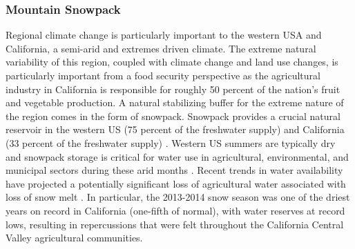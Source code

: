 \documentclass[11pt]{article}
\begin{document}
\subsubsection{Mountain Snowpack}

Regional climate change is particularly important to the western USA and California, a semi-arid and extremes driven climate.  The extreme natural variability of this region, coupled with climate change and land use changes, is particularly important from a food security perspective as the agricultural industry in California is responsible for roughly 50 percent of the nation's fruit and vegetable production.  A natural stabilizing buffer for the extreme nature of the region comes in the form of snowpack. Snowpack provides a crucial natural reservoir in the western US (75 percent of the freshwater supply) and California (33 percent of the freshwater supply) \citep{cayan1996interannual}.  Western US summers are typically dry and snowpack storage is critical for water use in agricultural, environmental, and municipal sectors during these arid months \citep{dettinger1995large, mote_declining_2005, maurer2007detection}.  Recent trends in water availability have projected a potentially significant loss of agricultural water associated with loss of snow melt \citep{dyer2006spatial}. In particular, the 2013-2014 snow season was one of the driest years on record in California (one-fifth of normal), with water reserves at record lows, resulting in repercussions that were felt throughout the California Central Valley agricultural communities.

\end{document}
